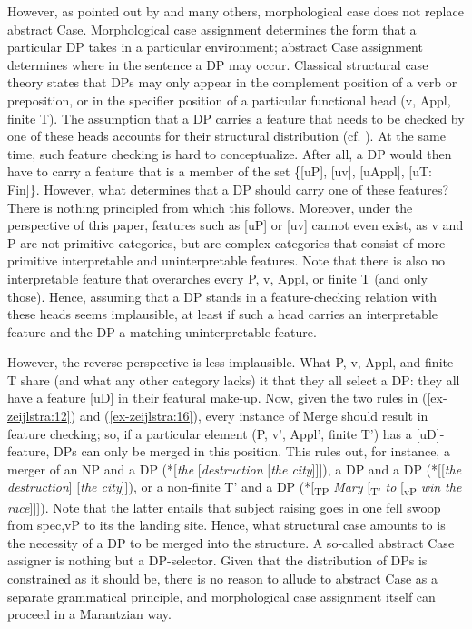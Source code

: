 \documentclass[output=paper
,modfonts
,nonflat]{langsci/langscibook}
\begin{document}
However, as pointed out by \citet{Legate2008} and many others, morphological case does not replace abstract Case. Morphological case assignment determines the form that a particular DP takes in a particular environment; abstract Case assignment determines where in the sentence a DP may occur. Classical structural case theory states that DPs may only appear in the complement position of a verb or preposition, or in the specifier position of a particular functional head (v, Appl, finite T). The assumption that a DP carries a feature that needs to be checked by one of these heads accounts for their structural distribution (cf. \citealt{Chomsky1995, Chomsky2001}). At the same time, such feature checking is hard to conceptualize. After all, a DP would then have to carry a feature that is a member of the set \{[uP], [uv], [uAppl], [uT: Fin]\}. However, what determines that a DP should carry one of these features? There is nothing principled from which this follows. Moreover, under the perspective of this paper, features such as [uP] or [uv] cannot even exist, as v and P are not primitive categories, but are complex categories that consist of more primitive interpretable and uninterpretable features. Note that there is also no interpretable feature that overarches every P, v, Appl, or finite T (and only those). Hence, assuming that a DP stands in a feature-checking relation with these heads seems implausible, at least if such a head carries an interpretable feature and the DP a matching uninterpretable feature.

However, the reverse perspective is less implausible. What P, v, Appl, and finite T share (and what any other category lacks) it that they all select a DP: they all have a feature [uD] in their featural make-up. Now, given the two rules in (\ref{ex-zeijlstra:12}) and (\ref{ex-zeijlstra:16}), every instance of Merge should result in feature checking; so, if a particular element (P, v’, Appl’, finite T’) has a [uD]-feature, DPs can only be merged in this position. This rules out, for instance, a merger of an NP and a DP (*[\textit{the} [\textit{destruction} [\textit{the city}]]]), a DP and a DP (*[[\textit{the destruction}] [\textit{the city}]]), or a non-finite T’ and a DP (*[\textsubscript{TP} \textit{Mary} [\textsubscript{T’} \textit{to} [\textsubscript{vP} \textit{win the race}]]]). Note that the latter entails that subject raising goes in one fell swoop from spec,vP to its the landing site. Hence, what structural case amounts to is the necessity of a DP to be merged into the structure. A so-called abstract Case assigner is nothing but a DP-selector. Given that the distribution of DPs is constrained as it should be, there is no reason to allude to abstract Case as a separate grammatical principle, and morphological case assignment itself can proceed in a Marantzian way.
\end{document}
